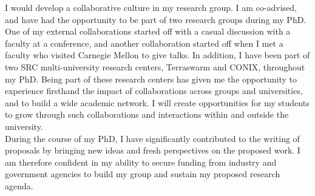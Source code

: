 \documentclass[10pt]{article}
\begin{document}
I would develop a collaborative culture in my research group.
I am co-advised, and have had the opportunity  to be part of two research groups during my PhD. One of my external collaborations started off with a casual discussion with a faculty at a conference, and another collaboration started off when I met a faculty who visited Carnegie Mellon to give talks. %
In addition, I have been part of two SRC multi-university research centers, Terraswarm and CONIX, throughout my PhD. Being part of these research centers has given me the opportunity to experience firsthand the impact of collaborations across groups and universities, and to build a wide academic network. I will create opportunities for my students to grow through such collaborations and interactions within and outside the university.  \\


During the course of my PhD, I have significantly contributed to the writing of proposals by bringing new ideas and fresh perspectives on the proposed work. I am therefore confident in my ability to secure funding from industry and government agencies to build my group and sustain my proposed research agenda.  %





\end{document}
